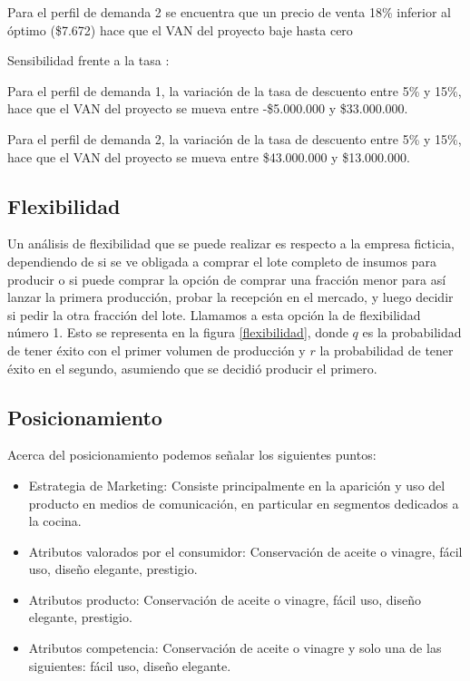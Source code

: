 Para el perfil de demanda 2 se encuentra que un precio de venta 18\% inferior al óptimo (\$7.672) hace que el VAN del proyecto baje hasta cero

Sensibilidad frente a la tasa :

Para el perfil de demanda 1, la variación de la tasa de descuento entre 5\% y 15\%, hace que el VAN del proyecto se mueva entre  -\$5.000.000 y  \$33.000.000.

Para el perfil de demanda 2, la variación de la tasa de descuento entre 5\% y 15\%, hace que el VAN del proyecto se mueva entre \$43.000.000 y  \$13.000.000.



\subsection{Flexibilidad}

Un análisis de flexibilidad que se puede realizar es respecto a la empresa ficticia, dependiendo de si se ve obligada a comprar el lote completo de insumos para producir o si puede comprar la opción de comprar una fracción menor para así lanzar la primera producción, probar la recepción en el mercado, y luego decidir si pedir la otra fracción del lote. Llamamos a esta opción la de flexibilidad número 1. Esto se representa en la figura \ref{flexibilidad}, donde $q$ es la probabilidad de tener éxito con el primer volumen de producción y $r$ la probabilidad de tener éxito en el segundo, asumiendo que se decidió producir el primero.

\subsection{Posicionamiento}

Acerca del posicionamiento podemos señalar los siguientes puntos:

\begin{itemize}

\item Estrategia de Marketing: Consiste principalmente en la aparición y uso del producto en medios de comunicación, en particular en segmentos dedicados a la cocina.

\item Atributos valorados por el consumidor: Conservación de aceite o vinagre, fácil uso, diseño elegante, prestigio.

\item Atributos producto: Conservación de aceite o vinagre, fácil uso, diseño elegante, prestigio.

\item  Atributos competencia: Conservación de aceite o vinagre y solo una de las siguientes: fácil uso, diseño elegante.

\end{itemize}
